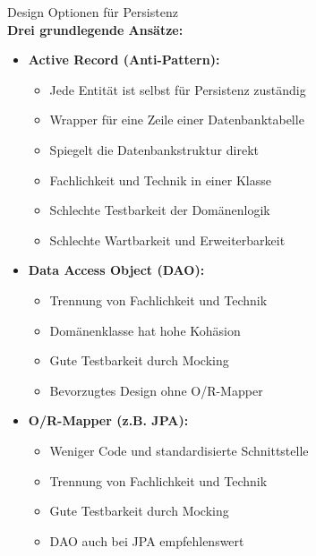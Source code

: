 \begin{concept}{Design Optionen für Persistenz}\\
\textbf{Drei grundlegende Ansätze:}
\begin{itemize}
    \item \textbf{Active Record (Anti-Pattern):}
    \begin{itemize}
        \item Jede Entität ist selbst für Persistenz zuständig
        \item Wrapper für eine Zeile einer Datenbanktabelle
        \item Spiegelt die Datenbankstruktur direkt
        \item Fachlichkeit und Technik in einer Klasse
        \item Schlechte Testbarkeit der Domänenlogik
        \item Schlechte Wartbarkeit und Erweiterbarkeit
    \end{itemize}

    \item \textbf{Data Access Object (DAO):}
    \begin{itemize}
        \item Trennung von Fachlichkeit und Technik
        \item Domänenklasse hat hohe Kohäsion
        \item Gute Testbarkeit durch Mocking
        \item Bevorzugtes Design ohne O/R-Mapper
    \end{itemize}

    \item \textbf{O/R-Mapper (z.B. JPA):}
    \begin{itemize}
        \item Weniger Code und standardisierte Schnittstelle
        \item Trennung von Fachlichkeit und Technik
        \item Gute Testbarkeit durch Mocking
        \item DAO auch bei JPA empfehlenswert
    \end{itemize}
\end{itemize}
\end{concept}

